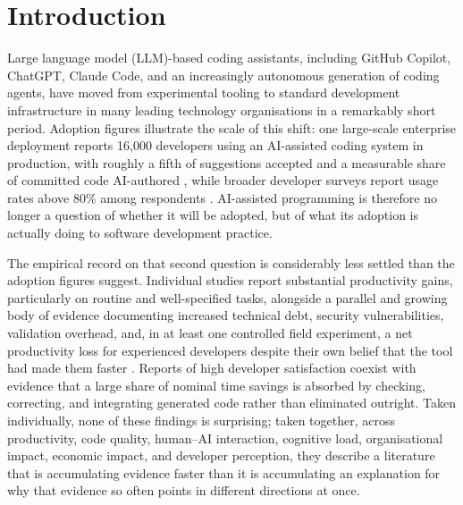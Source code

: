 \begin{abstract}
The socio-technical equilibrium perspective advanced here reframes AI-assisted programming not as a productivity enhancer with side effects, but as a reconfiguration of where development effort is concentrated, who bears it, and whether that reconfiguration is governed or left to accumulate as unrecorded cost. Implications for practice, governance, and future research design are discussed.

\end{abstract}

\section{Introduction}
\label{intro}

Large language model (LLM)-based coding assistants, including GitHub Copilot, ChatGPT, Claude Code, and an increasingly autonomous generation of coding agents, have moved from experimental tooling to standard development infrastructure in many leading technology organisations in a remarkably short period. Adoption figures illustrate the scale of this shift: one large-scale enterprise deployment reports 16,000 developers using an AI-assisted coding system in production, with roughly a fifth of suggestions accepted and a measurable share of committed code AI-authored \cite{murali_ai-assisted_2024}, while broader developer surveys report usage rates above 80\% among respondents \cite{sergeyuk_using_2025}. AI-assisted programming is therefore no longer a question of whether it will be adopted, but of what its adoption is actually doing to software development practice.

The empirical record on that second question is considerably less settled than the adoption figures suggest. Individual studies report substantial productivity gains, particularly on routine and well-specified tasks, alongside a parallel and growing body of evidence documenting increased technical debt, security vulnerabilities, validation overhead, and, in at least one controlled field experiment, a net productivity loss for experienced developers despite their own belief that the tool had made them faster \cite{becker_measuring_2025}. Reports of high developer satisfaction coexist with evidence that a large share of nominal time savings is absorbed by checking, correcting, and integrating generated code rather than eliminated outright. Taken individually, none of these findings is surprising; taken together, across productivity, code quality, human--AI interaction, cognitive load, organisational impact, economic impact, and developer perception, they describe a literature that is accumulating evidence faster than it is accumulating an explanation for why that evidence so often points in different directions at once.

